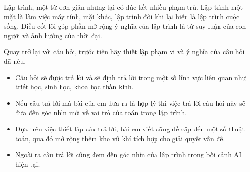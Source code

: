 Lập trình, một từ đơn giản nhưng lại có đúc kết nhiều phạm trù. Lập trình một mặt là làm việc máy tính, mặt khác, lập trình đôi khi lại hiểu là lập trình cuộc sống. Điều cốt lõi góp phần mở rộng ý nghĩa của lập trình là từ suy luận của con người và ảnh hưởng của thời đại.

Quay trở lại với câu hỏi, trước tiên hãy thiết lập phạm vi và ý nghĩa của câu hỏi đã nêu.
\begin{itemize}
	\item Câu hỏi sẽ được trả lời và sẽ định trả lời trong một số lĩnh vực liên quan như triết học, sinh học, khoa học thần kinh.
	\item Nếu câu trả lời mà bài của em đưa ra là hợp lý thì việc trả lời câu hỏi này sẽ đưa đến góc nhìn mới về vai trò của toán trong lập trình.
	\item Dựa trên việc thiết lập câu trả lời, bài em viết cũng đề cập đến một số thuật toán, qua đó mở rộng thêm kho vũ khí tích hợp cho giải quyết vấn đề.
	\item Ngoài ra câu trả lời cũng đem đến góc nhìn của lập trình trong bối cảnh AI hiện tại. 
\end{itemize}
